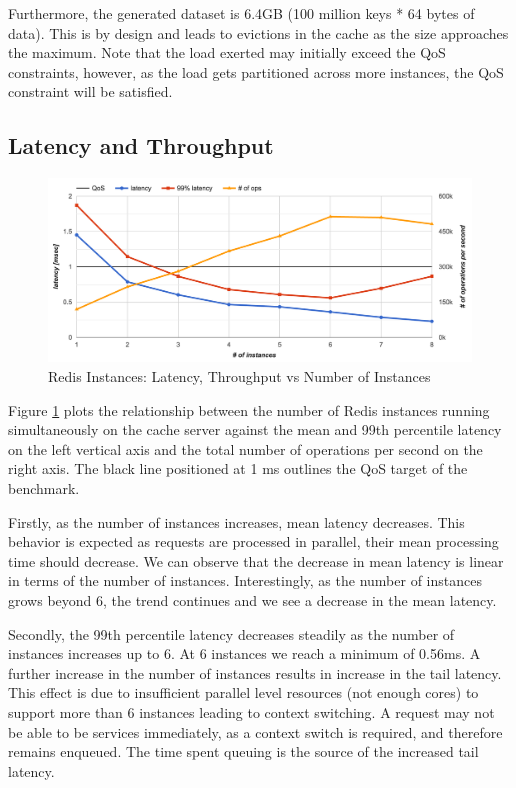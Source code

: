 Furthermore, the generated dataset is 6.4GB (100 million keys * 64 bytes of data). This is by design and leads to evictions in the cache as the size approaches the maximum. Note that the load exerted may initially exceed the QoS constraints, however, as the load gets partitioned across more instances, the QoS constraint will be satisfied.


\subsection{Latency and Throughput}

\begin{figure}[h]
    \includegraphics[width=\textwidth]{./res2/r_instances_latency.png}
    \caption{Redis Instances: Latency, Throughput vs Number of Instances}
    \label{fig:r_instances_latency}
\end{figure}

Figure \ref{fig:r_instances_latency} plots the relationship between the number of Redis instances running simultaneously on the cache server against the mean and 99th percentile latency on the left vertical axis and the total number of operations per second on the right axis. The black line positioned at 1 ms outlines the QoS target of the benchmark.

Firstly, as the number of instances increases, mean latency decreases. This behavior is expected as requests are processed in parallel, their mean processing time should decrease. We can observe that the decrease in mean latency is linear in terms of the number of instances. Interestingly, as the number of instances grows beyond 6, the trend continues and we see a decrease in the mean latency.

Secondly, the 99th percentile latency decreases steadily as the number of instances increases up to 6. At 6 instances we reach a minimum of 0.56ms. A further increase in the number of instances results in increase in the tail latency. This effect is due to insufficient parallel level resources (not enough cores) to support more than 6 instances leading to context switching. A request may not be able to be services immediately, as a context switch is required, and therefore remains enqueued. The time spent queuing is the source of the increased tail latency.

